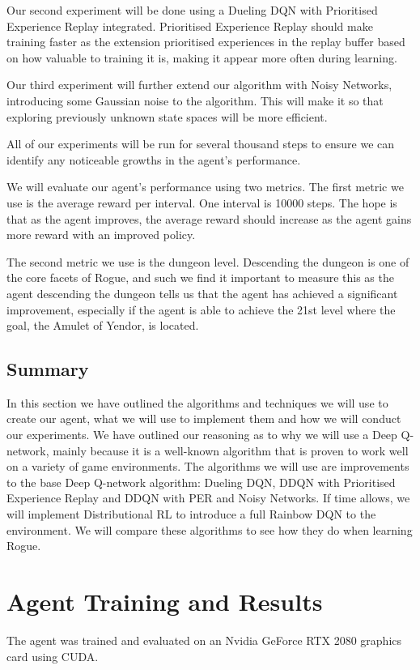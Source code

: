 \documentclass[12pt,a4paper]{article}
\begin{document}
    Our second experiment will be done using a Dueling DQN with Prioritised Experience Replay integrated.
    Prioritised Experience Replay should make training faster as the extension prioritised experiences in the replay
    buffer based on how valuable to training it is, making it appear more often during learning.

    Our third experiment will further extend our algorithm with Noisy Networks, introducing some Gaussian noise to the
    algorithm.
    This will make it so that exploring previously unknown state spaces will be more efficient.

    All of our experiments will be run for several thousand steps to ensure we can identify any noticeable growths
    in the agent's performance.

    We will evaluate our agent's performance using two metrics.
    The first metric we use is the average reward per interval.
    One interval is 10000 steps.
    The hope is that as the agent improves, the average reward should increase as the agent gains more reward with an improved policy.

    The second metric we use is the dungeon level.
    Descending the dungeon is one of the core facets of Rogue, and such we find it important to measure this as the agent descending the dungeon
    tells us that the agent has achieved a significant improvement, especially if the agent is able to achieve the 21st level where
    the goal, the Amulet of Yendor, is located.

    \subsection{Summary}\label{subsec:summary2}
    In this section we have outlined the algorithms and techniques we will use to create our agent, what we will use to implement them and how we will conduct our experiments.
    We have outlined our reasoning as to why we will use a Deep Q-network, mainly because it is a well-known algorithm that is proven to work well on a variety of game environments.
    The algorithms we will use are improvements to the base Deep Q-network algorithm: Dueling DQN, DDQN with Prioritised Experience Replay and DDQN with PER and Noisy Networks.
    If time allows, we will implement Distributional RL to introduce a full Rainbow DQN to the environment.
    We will compare these algorithms to see how they do when learning Rogue.

    \section{Agent Training and Results}\label{sec:agent-training-and-results}
    The agent was trained and evaluated on an Nvidia GeForce RTX 2080 graphics card using CUDA.
\end{document}
